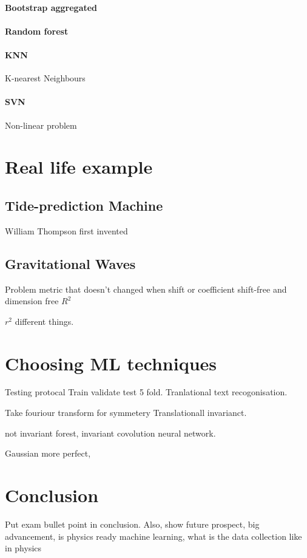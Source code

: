\documentclass[12pt,a4paper]{article}
\begin{document}
\paragraph{Bootstrap aggregated}
\paragraph{Random forest}
\paragraph*{KNN}
K-nearest Neighbours
\paragraph*{SVN}
Non-linear problem
\section{Real life example}
\subsection{Tide-prediction Machine}
William Thompson first invented 
\subsection{Gravitational Waves}
Problem 
metric that doesn't changed when shift or 
coefficient  shift-free and dimension free
$R^2$

$r^2$ different things.
\section{Choosing ML techniques}
Testing protocal 
Train validate test 5 fold. 
Tranlational text recogonisation. 

Take fouriour transform for symmetery
Translationall invarianct.

not invariant forest,
invariant covolution neural network.

Gaussian more perfect,

\section{Conclusion}
Put exam bullet point in conclusion.
Also, show future prospect, big advancement, is physics ready machine learning, what is the data collection like in physics
\end{document}
